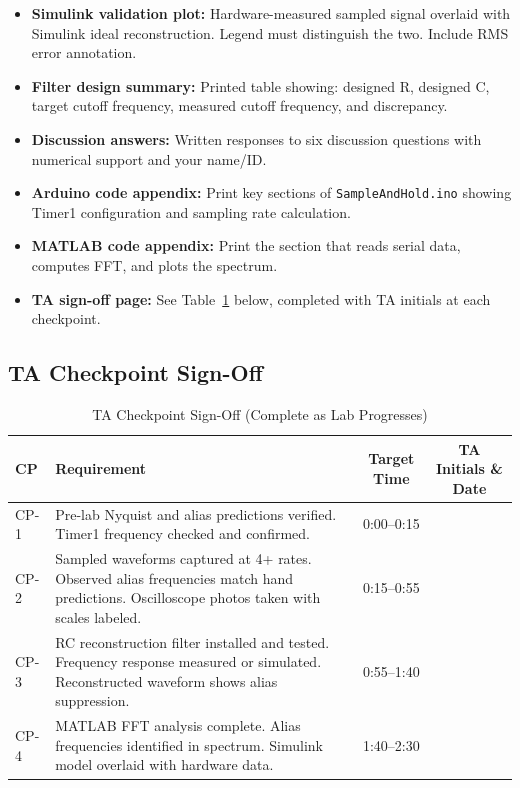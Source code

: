 \documentclass[11pt,letterpaper]{article}
\begin{document}
\begin{itemize}
    \item[$\square$] \textbf{Simulink validation plot:} Hardware-measured sampled signal overlaid with Simulink ideal reconstruction. Legend must distinguish the two. Include RMS error annotation.

    \item[$\square$] \textbf{Filter design summary:} Printed table showing: designed R, designed C, target cutoff frequency, measured cutoff frequency, and discrepancy.

    \item[$\square$] \textbf{Discussion answers:} Written responses to six discussion questions with numerical support and your name/ID.

    \item[$\square$] \textbf{Arduino code appendix:} Print key sections of \texttt{SampleAndHold.ino} showing Timer1 configuration and sampling rate calculation.

    \item[$\square$] \textbf{MATLAB code appendix:} Print the section that reads serial data, computes FFT, and plots the spectrum.

    \item[$\square$] \textbf{TA sign-off page:} See Table~\ref{tab:checkpoints} below, completed with TA initials at each checkpoint.
\end{itemize}

\subsection{TA Checkpoint Sign-Off}

\begin{table}[H]
    \centering
    \caption{TA Checkpoint Sign-Off (Complete as Lab Progresses)}
    \label{tab:checkpoints}
    \begin{tabularx}{\linewidth}{l X c c}
    \toprule
    \textbf{CP} & \textbf{Requirement} & \textbf{Target Time} & \textbf{TA Initials \& Date}\\
    \midrule
    CP-1 & Pre-lab Nyquist and alias predictions verified. Timer1 frequency checked and confirmed. & 0:00--0:15 & \underline{\hspace{2.5cm}} \\[0.1in]
    CP-2 & Sampled waveforms captured at 4+ rates. Observed alias frequencies match hand predictions. Oscilloscope photos taken with scales labeled. & 0:15--0:55 & \underline{\hspace{2.5cm}} \\[0.1in]
    CP-3 & RC reconstruction filter installed and tested. Frequency response measured or simulated. Reconstructed waveform shows alias suppression. & 0:55--1:40 & \underline{\hspace{2.5cm}} \\[0.1in]
    CP-4 & MATLAB FFT analysis complete. Alias frequencies identified in spectrum. Simulink model overlaid with hardware data. & 1:40--2:30 & \underline{\hspace{2.5cm}} \\[0.1in]
    \bottomrule
    \end{tabularx}
\end{table}
\end{document}
